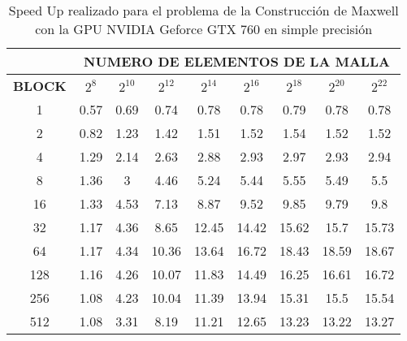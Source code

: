 \begin{table}[h!]
\centering
    \begin{tabular}{|c|c|c|c|c|c|c|c|c|}
    \hline
                   & \multicolumn{8}{c|}{\textbf{NUMERO DE ELEMENTOS DE LA MALLA}} \\ \hline
    \textbf{BLOCK} & $2^{8}$ & $2^{10}$& $2^{12}$& $2^{14}$& $2^{16}$& $2^{18}$& $2^{20}$& $2^{22}$\\ \hline
    1              & 0.57  & 0.69  & 0.74  & 0.78  & 0.78  & 0.79  & 0.78  & 0.78  \\ \hline
    2              & 0.82  & 1.23  & 1.42  & 1.51  & 1.52  & 1.54  & 1.52  & 1.52  \\ \hline
    4              & 1.29  & 2.14  & 2.63  & 2.88  & 2.93  & 2.97  & 2.93  & 2.94  \\ \hline
    8              & 1.36  & 3     & 4.46  & 5.24  & 5.44  & 5.55  & 5.49  & 5.5   \\ \hline
    16             & 1.33  & 4.53  & 7.13  & 8.87  & 9.52  & 9.85  & 9.79  & 9.8   \\ \hline
    32             & 1.17  & 4.36  & 8.65  & 12.45 & 14.42 & 15.62 & 15.7  & 15.73 \\ \hline
    64             & 1.17  & 4.34  & 10.36 & 13.64 & 16.72 & 18.43 & 18.59 & 18.67 \\ \hline
    128            & 1.16  & 4.26  & 10.07 & 11.83 & 14.49 & 16.25 & 16.61 & 16.72 \\ \hline
    256            & 1.08  & 4.23  & 10.04 & 11.39 & 13.94 & 15.31 & 15.5  & 15.54 \\ \hline
    512            & 1.08  & 3.31  & 8.19  & 11.21 & 12.65 & 13.23 & 13.22 & 13.27 \\ \hline
    \end{tabular}
    \caption{Speed Up realizado para el problema de la Construcción de Maxwell con la GPU NVIDIA Geforce GTX 760 en simple precisión}
    \label{tab:s_760_MxC_simple_10}
    \end{table}
